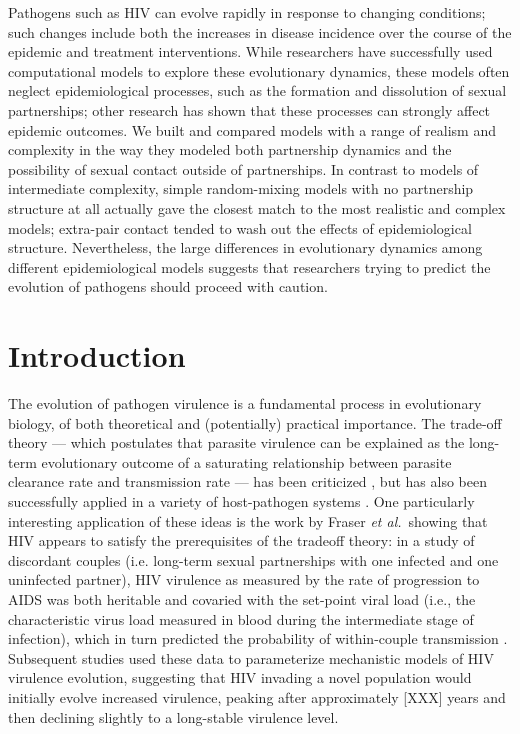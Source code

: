 \documentclass[10pt,letterpaper]{article}
\newcommand{\etal}{\textit{et al.}}
\begin{document}

Pathogens such as HIV can evolve rapidly in response to changing
conditions; such changes include both the increases in disease
incidence over the course of the epidemic and treatment
interventions. While researchers have successfully used computational
models to explore these evolutionary dynamics, these models often
neglect epidemiological processes, such as the formation and
dissolution of sexual partnerships; other research has shown that
these processes can strongly affect epidemic outcomes. We built and
compared models with a range of realism and complexity in the way they
modeled both partnership dynamics and the possibility of sexual
contact outside of partnerships. In contrast to models of intermediate
complexity, simple random-mixing models with no partnership structure
at all actually gave the closest match to the most realistic and
complex models; extra-pair contact tended to wash out the effects
of epidemiological structure. Nevertheless, the large differences
in evolutionary dynamics among different epidemiological models
suggests that researchers trying to predict the evolution of
pathogens should proceed with caution.

\linenumbers

\section*{Introduction}

The evolution of pathogen virulence is a fundamental process in
evolutionary biology, of both theoretical and (potentially) practical
importance. The trade-off theory \cite{Ebert1999} --- which
postulates that parasite virulence can be explained as the long-term
evolutionary outcome of a saturating relationship between parasite
clearance rate and transmission rate --- has been criticized
\cite{EbertBull2003,alizon_adaptive_2015}, but has also been
successfully applied in a variety of host-pathogen systems \cite{Dwyer+1990,mackinnon1999genetic,jensen2006empirical,deroode2008virulence}. One
particularly interesting application of these ideas is the work by
Fraser \etal\ showing that HIV appears to satisfy the prerequisites of
the tradeoff theory: in a study of discordant couples (i.e. long-term
sexual partnerships with one infected and one uninfected partner), HIV
virulence as measured by the rate of progression to AIDS was both
heritable and covaried with the set-point viral load (i.e., the
characteristic virus load measured in blood during the intermediate
stage of infection), which in turn predicted the probability of
within-couple transmission
\cite{Fraser+2007,fraser_virulence_2014}. Subsequent studies
\cite{shirreff_transmission_2011,herbeck_hiv_2014} used these data to
parameterize mechanistic models of HIV virulence evolution, suggesting
that HIV invading a novel population would initially evolve increased
virulence, peaking after approximately [XXX] years and then declining
slightly to a long-stable virulence level.
\end{document}
